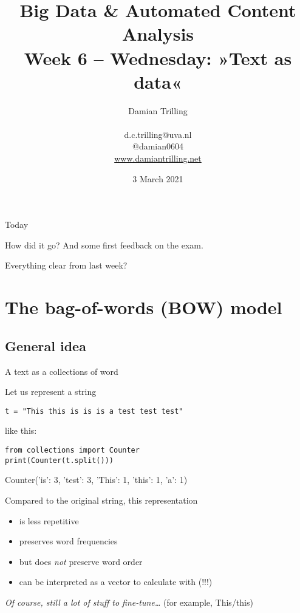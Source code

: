\documentclass[compress]{beamer}
\title[Big Data and Automated Content Analysis]{\textbf{Big Data \& Automated Content Analysis} \\ Week 6 -- Wednesday: »Text as data«}
\author[Damian Trilling]{Damian Trilling \\ ~ \\ \footnotesize{d.c.trilling@uva.nl \\@damian0604} \\ \url{www.damiantrilling.net}}
\date{3 March 2021}
\institute[UvA]{Afdeling Communicatiewetenschap \\Universiteit van Amsterdam}
\begin{document}
	
	\begin{frame}{}
		\titlepage
	\end{frame}
	
	\begin{frame}{Today}
		\tableofcontents
	\end{frame}
	
	
\begin{frame}[standout]	
	How did it go? And some first feedback on the exam.
\end{frame}
	
	
	
	\begin{frame}[standout]	
		Everything clear from last week?
	\end{frame}
	
\section{The bag-of-words (BOW) model}

\subsection{General idea}

\begin{frame}[fragile]{A text as a collections of word}

Let us represent a string 
\begin{lstlisting}
t = "This this is is is a test test test"
\end{lstlisting}
like this:\\
\begin{lstlisting}
from collections import Counter
print(Counter(t.split()))
\end{lstlisting}
\begin{lstlistingoutput}
Counter({'is': 3, 'test': 3, 'This': 1, 'this': 1, 'a': 1})
\end{lstlistingoutput}

\pause 
Compared to the original string, this representation
\begin{itemize}
	\item is less repetitive
	\item preserves word frequencies
	\item but does \emph{not} preserve word order
	\item can be interpreted as a vector to calculate with (!!!)
\end{itemize}

\tiny{\emph{Of course, still a lot of stuff to fine-tune\ldots}  (for example, This/this)}
\end{frame}
\end{document}

